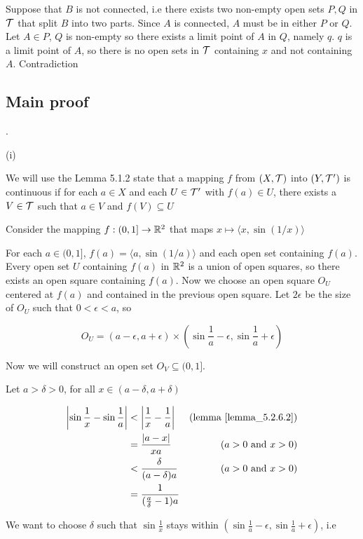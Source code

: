 \documentclass{article}
\begin{document}
Suppose that $B$ is not connected, i.e there exists two non-empty open sets $P, Q$ in $\mathcal{T}$ that split $B$ into two parts. Since $A$ is connected, $A$ must be in either $P$ or $Q$. Let $A \in P$, $Q$ is non-empty so there exists a limit point of $A$ in $Q$, namely $q$.
$q$ is a limit point of $A$, so there is no open sets in $\mathcal{T}$ containing $x$ and not containing $A$. Contradiction

\subsection*{Main proof} .

(i)

We will use the Lemma 5.1.2 state that a mapping $f$ from $(X, \mathcal{T})$ into $(Y, \mathcal{T}')$ is continuous if for each $a \in X$ and each $U \in \mathcal{T}'$ with $f(a) \in U$, there exists a $V \in \mathcal{T}$ such that $a \in V$ and $f(V) \subseteq U$

Consider the mapping $f: (0, 1] \to \mathbb{R}^2$ that maps $x \mapsto \langle x, \sin(1/x) \rangle$

For each $a \in (0, 1]$, $f(a) = \langle a, \sin(1/a) \rangle$ and each open set containing $f(a)$. Every open set $U$ containing $f(a)$ in $\mathbb{R}^2$ is a union of open squares, so there exists an open square containing $f(a)$. Now we choose an open square $O_U$ centered at $f(a)$ and contained in the previous open square. Let $2\epsilon$ be the size of $O_U$ such that $0 < \epsilon < a$, so

$$
    O_U = (a - \epsilon, a + \epsilon) \times (\sin\frac{1}{a} - \epsilon, \sin\frac{1}{a} + \epsilon)
$$


Now we will construct an open set $O_V \subseteq (0, 1]$.

Let $a > \delta > 0$, for all $x \in (a - \delta, a + \delta)$

\begin{align*}
    \left|\sin \frac{1}{x} - \sin \frac{1}{a} \right|
        &< \left| \frac{1}{x} - \frac{1}{a} \right| &\text{(lemma \ref{lemma_5.2.6.2})} \\
        &= \frac{|a - x|}{xa} &\text{($a > 0$ and $x > 0$)} \\
        &< \frac{\delta}{(a - \delta)a} &\text{($a > 0$ and $x > 0$)} \\
        &= \frac{1}{(\frac{a}{\delta} - 1)a}
\end{align*}

We want to choose $\delta$ such that $\sin \frac{1}{x}$ stays within $(\sin\frac{1}{a} - \epsilon, \sin\frac{1}{a} + \epsilon)$, i.e
\end{document}
